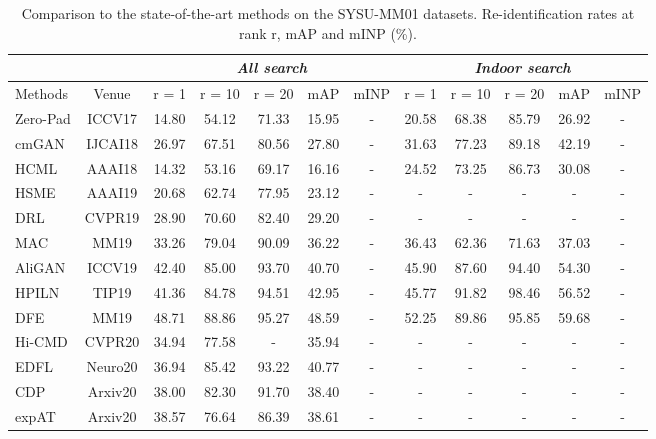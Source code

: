 \documentclass[journal]{IEEEtran}
\begin{document}
\begin{table*}
\caption{Comparison to the state-of-the-art methods on the SYSU-MM01 datasets. Re-identification rates at rank r, mAP and mINP (\%).}
\label{tab:sota_sysu}
  \centering
  \begin{tabular}{l|c|c|c|c|c|c||c|c|c|c|c}
    \toprule[2pt]
    \multicolumn{2}{c|}{}  & \multicolumn{5}{c||}{\emph{All search}} & \multicolumn{5}{c}{\emph{Indoor search}} \\ \hline
      Methods & Venue &   r = 1  & r = 10 & r = 20 & mAP & mINP  &  r = 1 &  r = 10 & r = 20 & mAP & mINP     \\ \toprule[1pt]
      Zero-Pad \cite{wu2017rgb}& ICCV17 & 14.80 & 54.12 & 71.33 & 15.95 & - & 20.58 & 68.38 & 85.79 & 26.92 &-  \\
      cmGAN \cite{dai2018cross} & IJCAI18 & 26.97 & 67.51 & 80.56 & 27.80 & - & 31.63 & 77.23 & 89.18 & 42.19 &-  \\
      HCML \cite{ye2018hierarchical} & AAAI18 & 14.32 & 53.16 & 69.17 & 16.16 &- & 24.52 & 73.25 & 86.73 & 30.08 &- \\ \hline
      HSME \cite{hao2019hsme} & AAAI19  & 20.68 & 62.74 & 77.95 & 23.12 &- & - & - & - & - & - \\
      DRL \cite{wang2019learning1}& CVPR19  & 28.90 & 70.60 & 82.40 & 29.20 &- & - & - & - & - & - \\
      MAC \cite{Ye2019ModalityawareCL} & MM19 & 33.26 & 79.04 & 90.09 & 36.22 &- & 36.43 & 62.36 & 71.63 & 37.03 &- \\
      AliGAN \cite{wang2019rgb} & ICCV19 & 42.40 & 85.00 & 93.70 & 40.70 &- & 45.90 & 87.60 & 94.40 & 54.30 &- \\
      HPILN \cite{zhao2019hpiln} & TIP19 & 41.36 & 84.78 & 94.51 & 42.95 &- & 45.77 & 91.82 & 98.46 & 56.52 &- \\
      DFE \cite{Hao2019DualalignmentFE} &  MM19 & 48.71 & 88.86 & 95.27 & 48.59 &- & 52.25 & 89.86 & 95.85 & 59.68 &-  \\ \hline
      Hi-CMD \cite{choi2020hi} & CVPR20 & 34.94 & 77.58 & - & 35.94 & -  &  - & - & - & - & - \\
      EDFL \cite{liu2020enhancing} & Neuro20 & 36.94 & 85.42 & 93.22 & 40.77 & - &  - & - & - & - & - \\
      CDP \cite{Fan2020CrossSpectrumDP} & Arxiv20 & 38.00 & 82.30 & 91.70 & 38.40 &- &  - & - & - & - & - \\
      expAT \cite{Ye2020BidirectionalEA} & Arxiv20 & 38.57 & 76.64 & 86.39 & 38.61 &- &  - & - & - & - & - \\

\end{tabular}
\end{table*}
\end{document}
